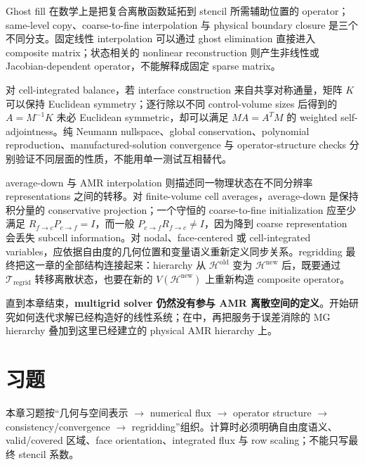 Ghost fill 在数学上是把复合离散函数延拓到 stencil 所需辅助位置的 operator；same-level copy、coarse-to-fine interpolation 与 physical boundary closure 是三个不同分支。固定线性 interpolation 可以通过 ghost elimination 直接进入 composite matrix；状态相关的 nonlinear reconstruction 则产生非线性或 Jacobian-dependent operator，不能解释成固定 sparse matrix。

对 cell-integrated balance，若 interface construction 来自共享对称通量，矩阵 $K$ 可以保持 Euclidean symmetry；逐行除以不同 control-volume sizes 后得到的 $A=M^{-1}K$ 未必 Euclidean symmetric，却可以满足 $MA=A^TM$ 的 weighted self-adjointness。纯 Neumann nullspace、global conservation、polynomial reproduction、manufactured-solution convergence 与 operator-structure checks 分别验证不同层面的性质，不能用单一测试互相替代。

average-down 与 AMR interpolation 则描述同一物理状态在不同分辨率 representations 之间的转移。对 finite-volume cell averages，average-down 是保持积分量的 conservative projection；一个守恒的 coarse-to-fine initialization 应至少满足 $R_{f\rightarrow c}P_{c\rightarrow f}=I$，而一般 $P_{c\rightarrow f}R_{f\rightarrow c}\neq I$，因为降到 coarse representation 会丢失 subcell information。对 nodal、face-centered 或 cell-integrated variables，应依据自由度的几何位置和变量语义重新定义同步关系。regridding 最终把这一章的全部结构连接起来：hierarchy 从 $\mathcal H^{\mathrm{old}}$ 变为 $\mathcal H^{\mathrm{new}}$ 后，既要通过 $\mathcal T_{\mathrm{regrid}}$ 转移离散状态，也要在新的 $V(\mathcal H^{\mathrm{new}})$ 上重新构造 composite operator。

直到本章结束，\textbf{multigrid solver 仍然没有参与 AMR 离散空间的定义}。开始研究如何迭代求解已经构造好的线性系统；在中，再把服务于误差消除的 MG hierarchy 叠加到这里已经建立的 physical AMR hierarchy 上。

\section*{习题}

本章习题按“几何与空间表示 $\rightarrow$ numerical flux $\rightarrow$ operator structure $\rightarrow$ consistency/convergence $\rightarrow$ regridding”组织。计算时必须明确自由度语义、valid/covered 区域、face orientation、integrated flux 与 row scaling；不能只写最终 stencil 系数。

